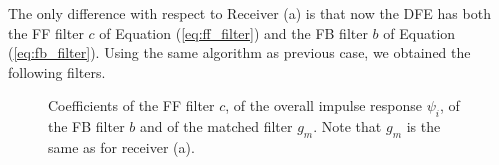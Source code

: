 \documentclass[a4paper, 12pt]{report}
\begin{document}
The only difference with respect to Receiver (a) is that now the DFE has both the FF filter $c$ of Equation (\ref{eq:ff_filter}) and the FB filter $b$ of Equation (\ref{eq:fb_filter}). Using the same algorithm as previous case, we obtained the following filters.

\begin{figure}[H]
	\centering
	\quad
	\caption{Coefficients of the FF filter $c$, of the overall impulse response $\psi_i$, of the FB filter $b$ and of the matched filter $g_m$. Note that $g_m$ is the same as for receiver (a).}\label{filters_b}
\end{figure}
\end{document}

